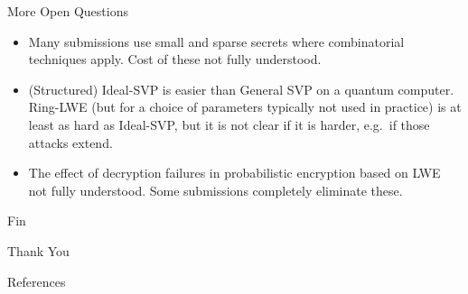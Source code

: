 \documentclass[xcolor=table,10pt,aspectratio=169]{beamer}
\begin{document}
\begin{frame}[label={sec:org82031ef}]{More Open Questions}
\begin{itemize}
\item Many submissions use small and sparse secrets where combinatorial techniques apply. Cost of these not fully understood.
\item (Structured) Ideal-SVP is easier than General SVP on a quantum computer. Ring-LWE (but for a choice of parameters typically not used in practice) is at least as hard as Ideal-SVP, but it is not clear if it is harder, e.g. if those attacks extend.
\item The effect of decryption failures in probabilistic encryption based on LWE not fully understood. Some submissions completely eliminate these.
\end{itemize}
\end{frame}

\begin{frame}[label={sec:orgcff666d},standout]{Fin}
\begin{center}
\Huge \alert{Thank You}
\end{center}
\end{frame}

\begin{frame}[allowframebreaks]{References}
\renewcommand*{\bibfont}{\scriptsize}
\printbibliography[heading=none]
\end{frame}
\end{document}
